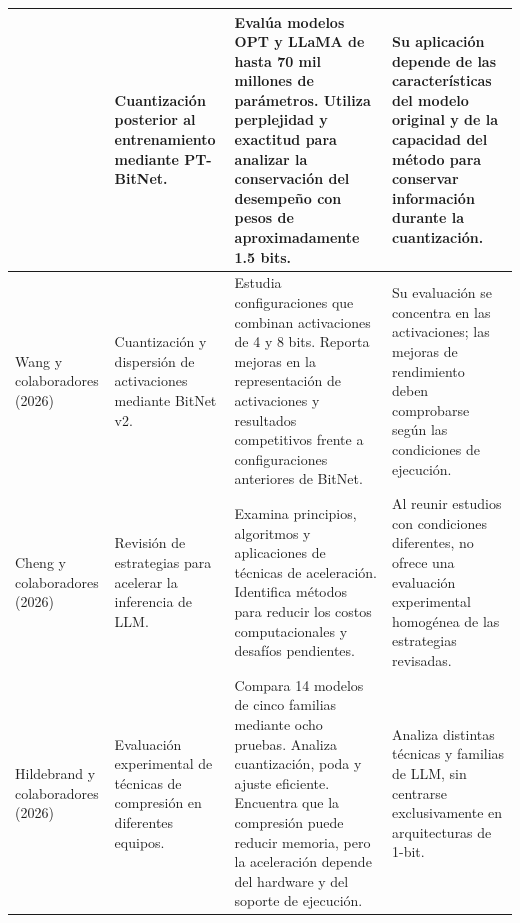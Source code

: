 \begin{table}[H]
\begin{tabular}{@{}L{2.5cm}L{3.15cm}L{5.35cm}L{4.05cm}@{}}
&
Cuantización posterior al entrenamiento mediante PT-BitNet.
&
Evalúa modelos OPT y LLaMA de hasta 70 mil millones de parámetros. Utiliza perplejidad y exactitud para analizar la conservación del desempeño con pesos de aproximadamente 1.5 bits.
&
Su aplicación depende de las características del modelo original y de la capacidad del método para conservar información durante la cuantización.
\\
\midrule
Wang y colaboradores (2026) \cite{bitnetV22026}
&
Cuantización y dispersión de activaciones mediante BitNet v2.
&
Estudia configuraciones que combinan activaciones de 4 y 8 bits. Reporta mejoras en la representación de activaciones y resultados competitivos frente a configuraciones anteriores de BitNet.
&
Su evaluación se concentra en las activaciones; las mejoras de rendimiento deben comprobarse según las condiciones de ejecución.
\\
\midrule
Cheng y colaboradores (2026) \cite{efficientLLMs}
&
Revisión de estrategias para acelerar la inferencia de LLM.
&
Examina principios, algoritmos y aplicaciones de técnicas de aceleración. Identifica métodos para reducir los costos computacionales y desafíos pendientes.
&
Al reunir estudios con condiciones diferentes, no ofrece una evaluación experimental homogénea de las estrategias revisadas.
\\
\midrule
Hildebrand y colaboradores (2026) \cite{compressionComparison2026}
&
Evaluación experimental de técnicas de compresión en diferentes equipos.
&
Compara 14 modelos de cinco familias mediante ocho pruebas. Analiza cuantización, poda y ajuste eficiente. Encuentra que la compresión puede reducir memoria, pero la aceleración depende del hardware y del soporte de ejecución.
&
Analiza distintas técnicas y familias de LLM, sin centrarse exclusivamente en arquitecturas de 1-bit.
\\
\bottomrule
\end{tabular}
\end{table}

